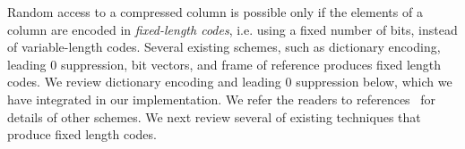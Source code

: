 %
Random access to a compressed column is possible only if the elements of a column are encoded in \emph{fixed-length codes}, i.e. using a fixed number of bits, instead of variable-length codes. Several existing schemes, such as dictionary encoding, leading 0 suppression, bit vectors, and frame of reference produces fixed length codes. We review dictionary encoding and leading 0 suppression below, which we have integrated in our implementation. We refer the readers to references~\cite{abadi-col-comp, goldstein:for, lemire:integer} for details of other schemes.
We next review several of existing techniques that produce fixed length codes.

